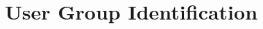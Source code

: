 \documentclass[manuscript,screen,review]{acmart}
\begin{document}
	
	
\section{User Group Identification}	



%
\end{document}
